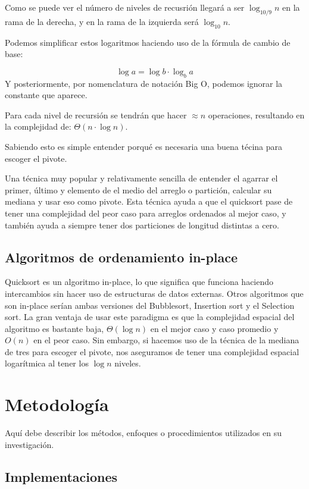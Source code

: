 \documentclass[conference]{IEEEtran}
\begin{document}
Como se puede ver el número de niveles de recusrión llegará a ser $\log_{10/9}{n}$ en la rama de la derecha, y en la rama de la izquierda será $\log_{10}{n}$.\par
Podemos simplificar estos logaritmos haciendo uso de la fórmula de cambio de base:

\begin{equation}
    \log{a} = \log{b}\cdot \log_b{a}
\end{equation}
Y posteriormente, por nomenclatura de notación Big O, podemos ignorar la constante que aparece.\par

Para cada nivel de recursión se tendrán que hacer $\approx n$ operaciones, resultando en la complejidad de: $\Theta(n\cdot \log{n})$.

Sabiendo esto es simple entender porqué es necesaria una buena técina para escoger el pivote.
\par Una técnica muy popular y relativamente sencilla de entender el agarrar el primer, último y elemento de el medio del arreglo o partición, 
calcular su mediana y usar eso como pivote.
Esta técnica ayuda a que el quicksort pase de tener una complejidad del peor caso para arreglos ordenados al mejor caso, y también ayuda a siempre tener dos particiones de longitud distintas a cero.

\subsection{Algoritmos de ordenamiento in-place}
Quicksort es un algoritmo in-place, lo que significa que funciona haciendo intercambios sin hacer uso de estructuras de datos externas. Otros algoritmos que son in-place serían ambas versiones del Bubblesort, Insertion sort y el Selection sort.
La gran ventaja de usar este paradigma es que la complejidad espacial del algoritmo es bastante baja, $\Theta(\log{n})$ en el mejor caso y caso promedio y $O(n)$ en el peor caso.
Sin embargo, si hacemos uso de la técnica de la mediana de tres para escoger el pivote, nos aseguramos de tener una complejidad espacial logarítmica al tener los $\log{n}$ niveles.\cite{space_complexity}

\section{Metodología}
Aquí debe describir los métodos, enfoques o procedimientos utilizados en su investigación.
\subsection{Implementaciones}
\end{document}
